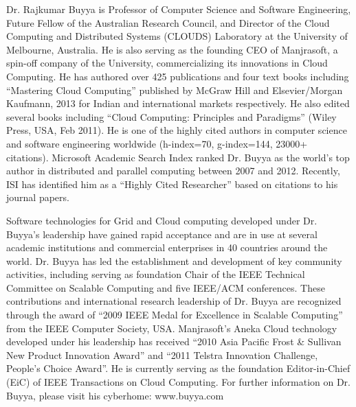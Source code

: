 \documentclass[publish]{IEEEtran}
\begin{document}
\vspace*{2\baselineskip}
\begin{biography}{Dr. Rajkumar Buyya} is Professor of Computer Science and Software Engineering, Future Fellow of the Australian Research Council, and Director of the Cloud Computing and Distributed Systems (CLOUDS) Laboratory at the University of Melbourne, Australia. He is also serving as the founding CEO of Manjrasoft, a spin-off company of the University, commercializing its innovations in Cloud Computing. He has authored over 425 publications and four text books including ``Mastering Cloud Computing'' published by McGraw Hill and Elsevier/Morgan Kaufmann, 2013 for Indian and international markets respectively. He also edited several books including ``Cloud Computing: Principles and Paradigms'' (Wiley Press, USA, Feb 2011). He is one of the highly cited authors in computer science and software engineering worldwide (h-index=70, g-index=144, 23000+ citations). Microsoft Academic Search Index ranked Dr. Buyya as the world's top author in distributed and parallel computing between 2007 and 2012. Recently, ISI has identified him as a ``Highly Cited Researcher'' based on citations to his journal papers.

Software technologies for Grid and Cloud computing developed under Dr. Buyya's leadership have gained rapid acceptance and are in use at several
academic institutions and commercial enterprises in 40 countries around the world. Dr.  Buyya has led the establishment and development of key community activities, including serving as foundation Chair of the IEEE Technical Committee on Scalable Computing and five IEEE/ACM conferences.
These contributions and international research leadership of Dr. Buyya are recognized through the award of ``2009 IEEE Medal for Excellence in
Scalable Computing'' from the IEEE Computer Society, USA. Manjrasoft's Aneka Cloud technology developed under his leadership has received ``2010
Asia Pacific Frost \& Sullivan New Product Innovation Award'' and ``2011 Telstra Innovation Challenge, People's Choice Award''. He is currently serving as the foundation Editor-in-Chief (EiC) of IEEE Transactions on Cloud Computing. For further information on Dr. Buyya, please visit his cyberhome: www.buyya.com
\end{biography}
\end{document}
